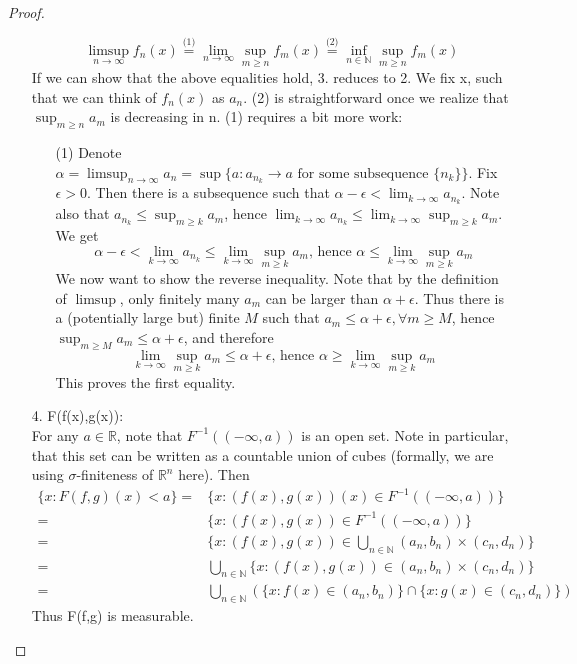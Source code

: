 \documentclass[11pt]{scrartcl}
\begin{document}
\begin{proof}
\begin{itemize}
$$\limsup_{n \rightarrow \infty} f_n(x) \stackrel{\text{(1)}}{=} \lim_{n\rightarrow\infty} \sup_{m\geq n} f_m(x) \stackrel{\text{(2)}}{=} \inf_{n \in \mathbb{N}} \sup_{m\geq n} f_m(x) $$
If we can show that the above equalities hold, 3. reduces to 2. We fix x, such that we can think of $f_n(x)$ as $a_n$. (2) is straightforward once we realize that $\sup_{m\geq n} a_m$ is decreasing in n. (1) requires a bit more work:
\begin{itemize}
\item[(1)] Denote $\alpha = \limsup_{n \rightarrow \infty} a_n = \sup\{a: a_{n_k}\rightarrow a \text{ for some subsequence } \{n_k\}\}$.
Fix $\epsilon > 0$. Then there is a subsequence such that $\alpha - \epsilon < \lim_{k \rightarrow \infty} a_{n_k}$. Note also that $a_{n_k} \leq \sup_{m\geq k} a_m$, hence $ \lim_{k\rightarrow\infty}  a_{n_k} \leq \lim_{k\rightarrow\infty} \sup_{m\geq k} a_m$. We get
$$\alpha - \epsilon < \lim_{k \rightarrow \infty} a_{n_k} \leq \lim_{k\rightarrow\infty} \sup_{m\geq k} a_m \text{, hence } \alpha \leq \lim_{k\rightarrow\infty} \sup_{m\geq k} a_m$$
We now want to show the reverse inequality. Note that by the definition of $\limsup$, only finitely many $a_m$ can be larger than $\alpha + \epsilon$. Thus there is a (potentially large but) finite $M$ such that $a_m \leq \alpha + \epsilon, \forall m \geq M$, hence $\sup_{m\geq M} a_m \leq \alpha + \epsilon$, and therefore $$\lim_{k\rightarrow \infty} \sup_{m\geq k} a_m \leq \alpha + \epsilon \text{, hence } \alpha \geq \lim_{k\rightarrow\infty} \sup_{m\geq k} a_m$$
This proves the first equality.
\end{itemize}
\item[4.] F(f(x),g(x)): \\
For any $a \in \mathbb{R}$, note that $F^{-1}((-\infty,a))$ is an open set. Note in particular, that this set can be written as a countable union of cubes (formally, we are using $\sigma$-finiteness of $\mathbb{R}^n$ here). Then 
\begin{align*}
\{x: F(f,g)(x) < a\} = & \{x: (f(x),g(x))(x) \in F^{-1}((-\infty,a))\}\\
= & \{x: (f(x),g(x)) \in F^{-1}((-\infty,a))\}\\
= & \{x: (f(x),g(x)) \in \bigcup_{n\in \mathbb{N}} (a_n,b_n)\times(c_n,d_n) \}\\
= & \bigcup_{n\in \mathbb{N}} \{x: (f(x),g(x)) \in (a_n,b_n)\times(c_n,d_n) \}\\
= & \bigcup_{n\in \mathbb{N}} (\{x: f(x) \in (a_n,b_n)\} \cap \{x:g(x) \in (c_n,d_n) \})
\end{align*}
Thus F(f,g) is measurable.
\end{itemize}
\end{proof}
\end{document}
